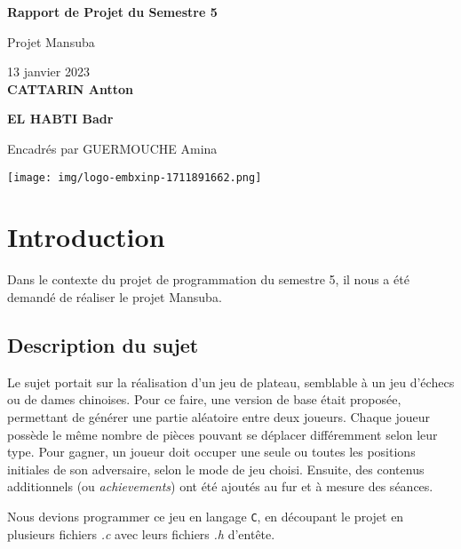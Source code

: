 \documentclass[a4paper]{article}
\begin{document}
\begin{titlepage}
\begin{center}
\vspace*{2cm}
\Huge
\textbf{Rapport de Projet du Semestre 5}

\vspace{0.5cm}
\huge
Projet Mansuba
            
\vspace{0.5cm}
\Large
13 janvier 2023 \\

\vfill
\huge
\textbf{CATTARIN Antton}

\textbf{EL HABTI Badr}

\vspace{0.5cm}
\Large
Encadrés par GUERMOUCHE Amina
       
\vfill

\texttt{[image: img/logo-embxinp-1711891662.png]}

\vspace{0.8cm}
\end{center}
\end{titlepage}

\newpage
\tableofcontents 

\listoffigures
\newpage

\section{Introduction}
\label{intro}

Dans le contexte du projet de programmation du semestre 5, il nous a été demandé de réaliser le projet Mansuba.

\subsection{Description du sujet}
\label{description}
Le sujet portait sur la réalisation d'un jeu de plateau, semblable à un jeu d'échecs ou de dames chinoises. Pour ce faire, une version de base était proposée, permettant de générer une partie aléatoire entre deux joueurs. Chaque joueur possède le même nombre de pièces pouvant se déplacer différemment selon leur type. Pour gagner, un joueur doit occuper une seule ou toutes les positions initiales de son adversaire, selon le mode de jeu choisi. Ensuite, des contenus additionnels (ou \emph{achievements}) ont été ajoutés au fur et à mesure des séances.

Nous devions programmer ce jeu en langage \verb|C|, en découpant le projet en plusieurs fichiers \emph{.c} avec leurs fichiers \emph{.h} d'entête.
\end{document}
